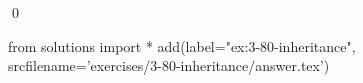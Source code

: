 
\begin{ex}
  \label{ex:3-80-inheritance}
  
  \qed
\end{ex}
\begin{python0}
from solutions import *
add(label="ex:3-80-inheritance",
    srcfilename='exercises/3-80-inheritance/answer.tex')
\end{python0}
